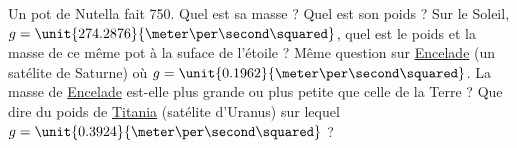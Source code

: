 

\begin{exercice}\label{exo014}
Un pot de Nutella fait \unit{750}{\gram}. Quel est sa masse ? Quel est son poids ? Sur le Soleil, $g=\unit{274.2876}{\meter\per\second\squared}$, quel est le poids et la masse de ce même pot à la suface de l'\'etoile ? Même question sur \href{http://fr.wikipedia.org/wiki/Encelade_(lune)}{Encelade} (un sat\'elite de Saturne) où $g=\unit{0.1962}{\meter\per\second\squared}$. La masse de \href{http://fr.wikipedia.org/wiki/Encelade_(mythologie)}{Encelade} est-elle plus grande ou plus petite que celle de la Terre ? Que dire du poids de \href{http://fr.wikipedia.org/wiki/Titania}{Titania} (sat\'elite d'Uranus) sur lequel $g=\unit{0.3924}{\meter\per\second\squared}$ ?
\end{exercice}
